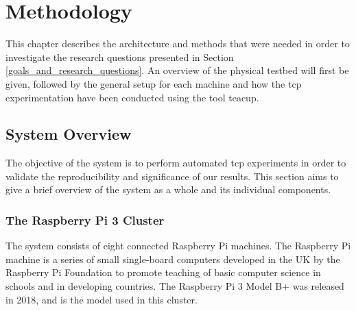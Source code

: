 \chapter{Methodology}

This chapter describes the architecture and methods that were needed in order to investigate the research questions presented in Section \ref{goals_and_research_questions}. An overview of the physical testbed will first be given, followed by the general setup for each machine and how the \gls{tcp} experimentation have been conducted using the tool \gls{teacup}. 









\section{System Overview}

The objective of the system is to perform automated \gls{tcp} experiments in order to validate the reproducibility and significance of our results. This section aims to give a brief overview of the system as a whole and its individual components.




\subsection{The Raspberry Pi 3 Cluster}

The system consists of eight connected Raspberry Pi machines. The Raspberry Pi machine is a series of small single-board computers developed in the UK by the Raspberry Pi Foundation to promote teaching of basic computer science in schools and in developing countries. The Raspberry Pi 3 Model B+ was released in 2018, and is the model used in this cluster.



